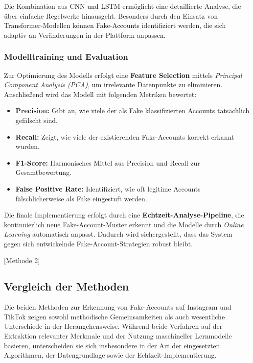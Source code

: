 \documentclass[12pt]{report}
\begin{document}
Die Kombination aus CNN und LSTM ermöglicht eine detaillierte Analyse, die über einfache Regelwerke hinausgeht. Besonders durch den Einsatz von Transformer-Modellen können Fake-Accounts identifiziert werden, die sich adaptiv an Veränderungen in der Plattform anpassen.

\subsubsection{Modelltraining und Evaluation}

Zur Optimierung des Modells erfolgt eine \textbf{Feature Selection} mittels \textit{Principal Component Analysis (PCA)}, um irrelevante Datenpunkte zu eliminieren. Anschließend wird das Modell mit folgenden Metriken bewertet:
\begin{itemize}
	\item \textbf{Precision:} Gibt an, wie viele der als Fake klassifizierten Accounts tatsächlich gefälscht sind.
	\item \textbf{Recall:} Zeigt, wie viele der existierenden Fake-Accounts korrekt erkannt wurden.
	\item \textbf{F1-Score:} Harmonisches Mittel aus Precision und Recall zur Gesamtbewertung.
	\item \textbf{False Positive Rate:} Identifiziert, wie oft legitime Accounts fälschlicherweise als Fake eingestuft werden.
\end{itemize}

Die finale Implementierung erfolgt durch eine \textbf{Echtzeit-Analyse-Pipeline}, die kontinuierlich neue Fake-Account-Muster erkennt und die Modelle durch \textit{Online Learning} automatisch anpasst. Dadurch wird sichergestellt, dass das System gegen sich entwickelnde Fake-Account-Strategien robust bleibt.

[Methode 2]

\subsection{Vergleich der Methoden}

Die beiden Methoden zur Erkennung von Fake-Accounts auf Instagram und TikTok zeigen sowohl methodische Gemeinsamkeiten als auch wesentliche Unterschiede in der Herangehensweise. Während beide Verfahren auf der Extraktion relevanter Merkmale und der Nutzung maschineller Lernmodelle basieren, unterscheiden sie sich insbesondere in der Art der eingesetzten Algorithmen, der Datengrundlage sowie der Echtzeit-Implementierung.
\end{document}
